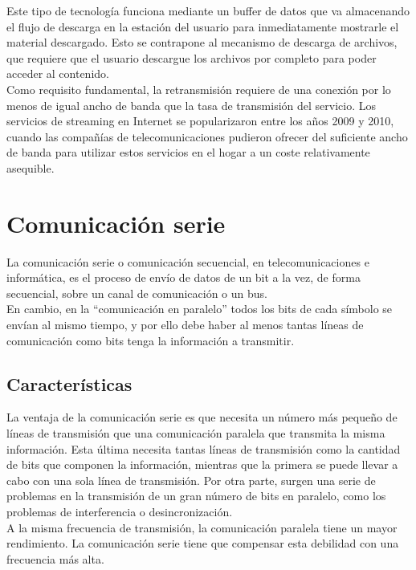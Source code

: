 Este tipo de tecnología funciona mediante un buffer de datos que va almacenando el flujo de descarga en la estación del usuario para inmediatamente mostrarle el material descargado. Esto se contrapone al mecanismo de
descarga de archivos, que requiere que el usuario descargue los archivos por completo para poder acceder al contenido.\\

Como requisito fundamental, la retransmisión requiere de una conexión por lo menos de igual ancho de banda que la tasa de transmisión del servicio. Los servicios de streaming en 
Internet se popularizaron entre los años 2009 y 2010, cuando las compañías de telecomunicaciones pudieron ofrecer del suficiente ancho de banda para utilizar estos servicios
en el hogar a un coste relativamente asequible.

\section{Comunicación serie}

La comunicación serie o comunicación secuencial, en telecomunicaciones e informática, es el proceso de envío de datos de un bit a la vez, de forma secuencial, sobre un canal
de comunicación o un bus.\\

En cambio, en la “comunicación en paralelo” todos los bits de cada símbolo se envían al mismo tiempo, y por ello debe haber al menos tantas líneas de comunicación como bits tenga
la información a transmitir.\\

\subsection{Características}

La ventaja de la comunicación serie es que necesita un número más pequeño de líneas de transmisión que una comunicación paralela que transmita la misma información. Esta última
necesita tantas líneas de transmisión como la cantidad de bits que componen la información, mientras que la primera se puede llevar a cabo con una sola línea de transmisión. Por otra parte,
surgen una serie de problemas en la transmisión de un gran número de bits en paralelo, como los problemas de interferencia o desincronización.\\

A la misma frecuencia de transmisión, la comunicación paralela tiene un mayor rendimiento. La comunicación serie tiene que compensar esta debilidad con una frecuencia más alta.\\

